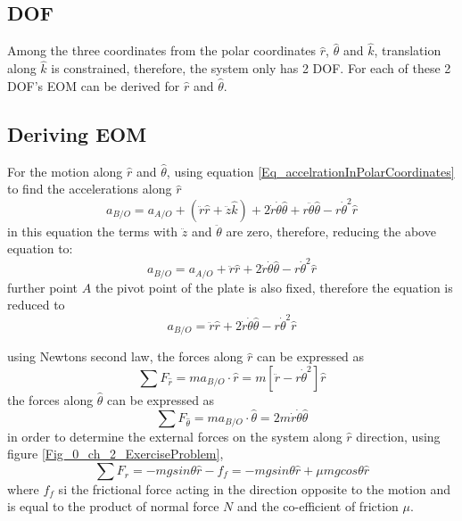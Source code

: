 \subsection{DOF}

Among the three coordinates from the polar coordinates $\hat{r}$, $\hat{\theta}$ and $\hat{k}$, translation along $\hat{k}$ is constrained, therefore, the system only has 2 DOF. For each of these 2 DOF's EOM can be derived for $\hat{r}$ and $\hat{\theta}$.

\subsection{Deriving EOM}

For the motion along $\hat{r}$ and $\hat{\theta}$, using equation \eqref{Eq_accelrationInPolarCoordinates} to find the accelerations along $\hat{r}$
\begin{equation}
a_{B/O} = a_{A/O} + (\ddot{r}\hat{r} + \ddot{z}\hat{k}) + 2 \dot{r} \dot{\theta} \hat{\theta} +  r \ddot{\theta} \hat{\theta} - r \dot{\theta}^{2} \hat{r}
\end{equation}
in this equation the terms with $\ddot{z}$ and $\ddot{\theta}$ are zero, therefore, reducing the above equation to:
\begin{equation}
a_{B/O} = a_{A/O} + \ddot{r}\hat{r} + 2 \dot{r} \dot{\theta} \hat{\theta}  - r \dot{\theta}^{2} \hat{r}
\end{equation}
further point $A$ the pivot point of the plate is also fixed, therefore the equation is reduced to
\begin{equation}
a_{B/O} = \ddot{r}\hat{r} + 2 \dot{r} \dot{\theta} \hat{\theta}  - r \dot{\theta}^{2} \hat{r}
\end{equation}

using Newtons second law, the forces along $\hat{r}$ can be expressed as
\begin{equation}\label{eq_0_ch_2_exerciseProblem1}
	\sum F_{\hat{r}} = m a_{B/O} \cdot \hat{r} = m \left[ \ddot{r}- r \dot{\theta}^{2} \right] \hat{r} 
\end{equation}
the forces along $\hat{\theta}$ can be expressed as
\begin{equation}
	\sum F_{\hat{\theta}} = m a_{B/O} \cdot \hat{\theta}  = 2 m \dot{r} \dot{\theta} \hat{\theta}
\end{equation}
in order to determine the external forces on the system along $\hat{r}$ direction, using figure \ref{Fig_0_ch_2_ExerciseProblem},
\begin{equation} \label{eq_0_ch_2_exerciseProblem}
	\sum F_{\hat{r}} = -mg sin\theta \hat{r} - f_{f} = -mg sin\theta \hat{r} + \mu mg cos\theta \hat{r}
\end{equation}
where $f_{f}$ si the frictional force acting in the direction opposite to the motion and is equal to the product of normal force $N$ and the co-efficient of friction $\mu$.

